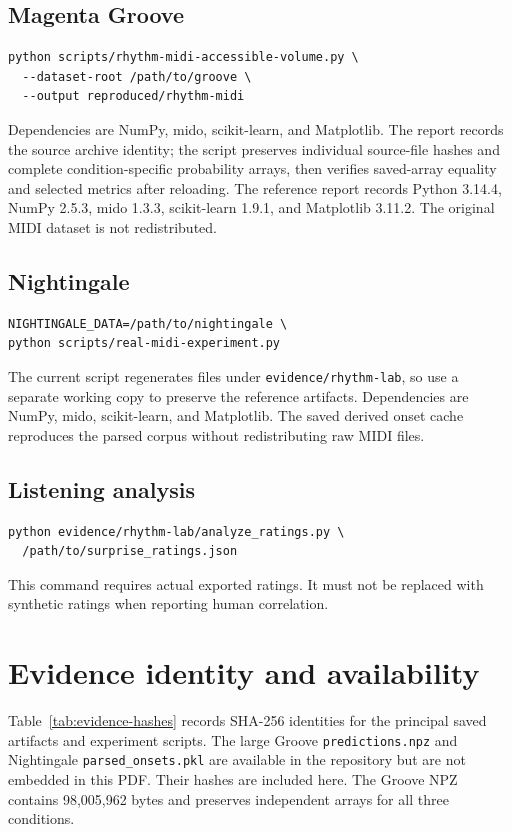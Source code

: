 \documentclass[11pt,a4paper]{article}
\begin{document}
\subsection{Magenta Groove}
\begin{lstlisting}
python scripts/rhythm-midi-accessible-volume.py \
  --dataset-root /path/to/groove \
  --output reproduced/rhythm-midi
\end{lstlisting}
Dependencies are NumPy, mido, scikit-learn, and Matplotlib. The report records the source archive identity; the script preserves individual source-file hashes and complete condition-specific probability arrays, then verifies saved-array equality and selected metrics after reloading. The reference report records Python 3.14.4, NumPy 2.5.3, mido 1.3.3, scikit-learn 1.9.1, and Matplotlib 3.11.2. The original MIDI dataset is not redistributed.

\subsection{Nightingale}
\begin{lstlisting}
NIGHTINGALE_DATA=/path/to/nightingale \
python scripts/real-midi-experiment.py
\end{lstlisting}
The current script regenerates files under \texttt{evidence/rhythm-lab}, so use a separate working copy to preserve the reference artifacts. Dependencies are NumPy, mido, scikit-learn, and Matplotlib. The saved derived onset cache reproduces the parsed corpus without redistributing raw MIDI files.

\subsection{Listening analysis}
\begin{lstlisting}
python evidence/rhythm-lab/analyze_ratings.py \
  /path/to/surprise_ratings.json
\end{lstlisting}
This command requires actual exported ratings. It must not be replaced with synthetic ratings when reporting human correlation.

\section{Evidence identity and availability}
Table~\ref{tab:evidence-hashes} records SHA-256 identities for the principal saved artifacts and experiment scripts. The large Groove \texttt{predictions.npz} and Nightingale \texttt{parsed\_onsets.pkl} are available in the repository but are not embedded in this PDF. Their hashes are included here. The Groove NPZ contains 98,005,962 bytes and preserves independent arrays for all three conditions.
\end{document}
